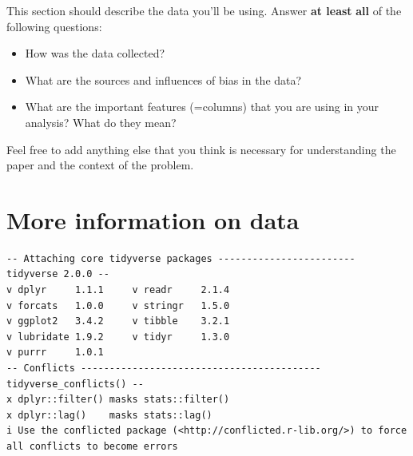 \documentclass[
  letterpaper,
  DIV=11,
  numbers=noendperiod]{scrreprt}
\begin{document}
\begin{tcolorbox}[enhanced jigsaw, bottomrule=.15mm, left=2mm, bottomtitle=1mm, leftrule=.75mm, coltitle=black, toprule=.15mm, breakable, opacitybacktitle=0.6, titlerule=0mm, colback=white, colbacktitle=quarto-callout-note-color!10!white, toptitle=1mm, arc=.35mm, rightrule=.15mm, colframe=quarto-callout-note-color-frame, opacityback=0, title=\textcolor{quarto-callout-note-color}{\faInfo}\hspace{0.5em}{From the report requirements}]

This section should describe the data you'll be using. Answer \textbf{at
least} \textbf{all} of the following questions:

\begin{itemize}
\item
  How was the data collected?
\item
  What are the sources and influences of bias in the data?
\item
  What are the important features (=columns) that you are using in your
  analysis? What do they mean?
\end{itemize}

Feel free to add anything else that you think is necessary for
understanding the paper and the context of the problem.

\end{tcolorbox}

\hypertarget{more-information-on-data}{%
\section{More information on data}\label{more-information-on-data}}

\begin{verbatim}
-- Attaching core tidyverse packages ------------------------ tidyverse 2.0.0 --
v dplyr     1.1.1     v readr     2.1.4
v forcats   1.0.0     v stringr   1.5.0
v ggplot2   3.4.2     v tibble    3.2.1
v lubridate 1.9.2     v tidyr     1.3.0
v purrr     1.0.1     
-- Conflicts ------------------------------------------ tidyverse_conflicts() --
x dplyr::filter() masks stats::filter()
x dplyr::lag()    masks stats::lag()
i Use the conflicted package (<http://conflicted.r-lib.org/>) to force all conflicts to become errors
\end{verbatim}
\end{document}
